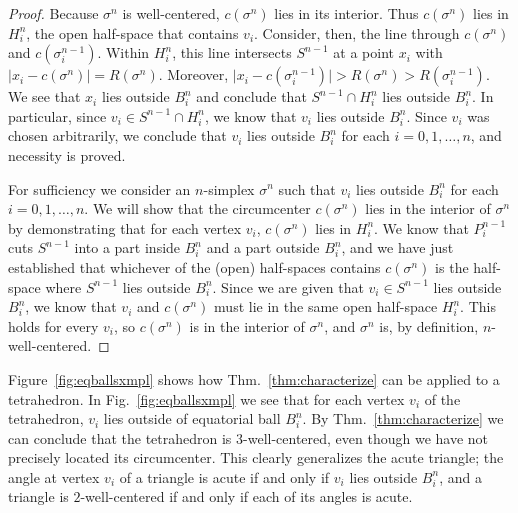 \documentclass[final]{siamltex}
\begin{document}
\begin{proof}
  Because $\sigma^{n}$ is well-centered, $c(\sigma^{n})$ lies in its
  interior.  Thus $c(\sigma^{n})$ lies in $H^{n}_{i}$, the open
  half-space that contains $v_{i}$.  Consider, then, the line through
  $c(\sigma^{n})$ and $c(\sigma^{n-1}_{i})$.
Within $H^{n}_{i}$, this line intersects $S^{n-1}$ at a point
  $x_{i}$ with $\lvert x_{i} - c(\sigma^{n})\rvert = R(\sigma^{n}).$
  Moreover, $\lvert x_{i} - c(\sigma^{n-1}_{i})\rvert > R(\sigma^{n})
  > R(\sigma^{n-1}_{i})$.  We see that $x_{i}$ lies outside
  $B^{n}_{i}$ and conclude that $S^{n-1} \cap H^{n}_{i}$ lies outside
  $B^{n}_{i}$.  In particular, since $v_{i} \in S^{n-1} \cap
  H^{n}_{i}$, we know that $v_{i}$ lies outside $B^{n}_{i}$.  Since
  $v_{i}$ was chosen arbitrarily, we conclude that $v_{i}$ lies
  outside $B^{n}_{i}$ for each $i = 0,1,\ldots,n$, and necessity is
  proved.

  For sufficiency we consider an $n$-simplex $\sigma^{n}$ such that
  $v_{i}$ lies outside $B^{n}_{i}$ for each $i=0,1,\ldots,n$.  We will
  show that the circumcenter $c(\sigma^{n})$ lies in the interior of
  $\sigma^{n}$ by demonstrating that for each vertex $v_{i}$,
  $c(\sigma^{n})$ lies in $H^{n}_{i}$.  We know that $P^{n-1}_{i}$
  cuts $S^{n-1}$ into a part inside $B^{n}_{i}$ and a part outside
  $B^{n}_{i}$, and we have just established that whichever of the
  (open) half-spaces contains $c(\sigma^{n})$ is the half-space where
  $S^{n-1}$ lies outside $B^{n}_{i}$.  Since we are given that $v_{i}
  \in S^{n-1}$ lies outside $B^{n}_{i}$, we know that $v_{i}$ and
  $c(\sigma^{n})$ must lie in the same open half-space $H^{n}_{i}$.
  This holds for every $v_{i}$, so $c(\sigma^{n})$ is in the interior
  of $\sigma^{n}$, and $\sigma^{n}$ is, by definition,
  $n$-well-centered.
\end{proof}


\bigskip

Figure~\ref{fig:eqballsxmpl} shows how Thm.~\ref{thm:characterize} can
be applied to a tetrahedron.  In Fig.~\ref{fig:eqballsxmpl} we see
that for each vertex $v_{i}$ of the tetrahedron, $v_{i}$ lies outside
of equatorial ball $B^{n}_{i}$.  By Thm.~\ref{thm:characterize} we can
conclude that the tetrahedron is $3$-well-centered, even though we
have not precisely located its circumcenter.  This clearly generalizes
the acute triangle; the angle at vertex $v_{i}$ of a triangle is acute
if and only if $v_{i}$ lies outside $B^{n}_{i}$, and a triangle is
$2$-well-centered if and only if each of its angles is acute.
\end{document}
